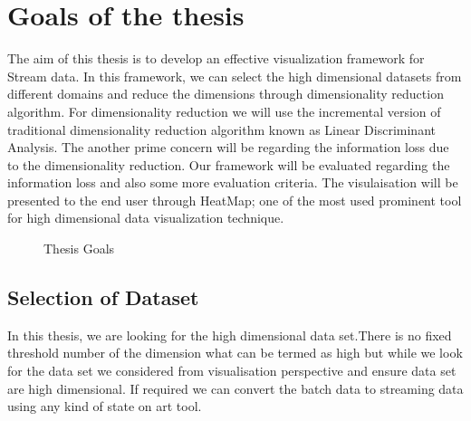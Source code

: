 \section{Goals of the thesis} 
The aim of this thesis is to develop an effective visualization framework for Stream data. In this framework, we can select the high dimensional datasets from different domains and reduce the dimensions through dimensionality reduction algorithm. For dimensionality reduction we will use the incremental version of traditional dimensionality reduction algorithm known as Linear Discriminant Analysis. The another prime concern will be regarding the information loss due to the dimensionality reduction. Our framework will be evaluated regarding the information loss and also some more evaluation criteria. The visulaisation will be presented to the end user through HeatMap; one of the most used prominent tool for high dimensional data visualization technique. 
\begin{figure}[htbp]
	\centering
	
	
	\caption{Thesis Goals}
	\label{fig:labelOfMyFigure2}
\end{figure}
\subsection{Selection of Dataset}
In this thesis, we are looking for the high dimensional data set.There is no fixed threshold number of the dimension what can be termed as high but while we look for the data set we considered from visualisation perspective and ensure data set are high dimensional. If required we can convert the batch data to streaming data using any kind of state on art tool.
